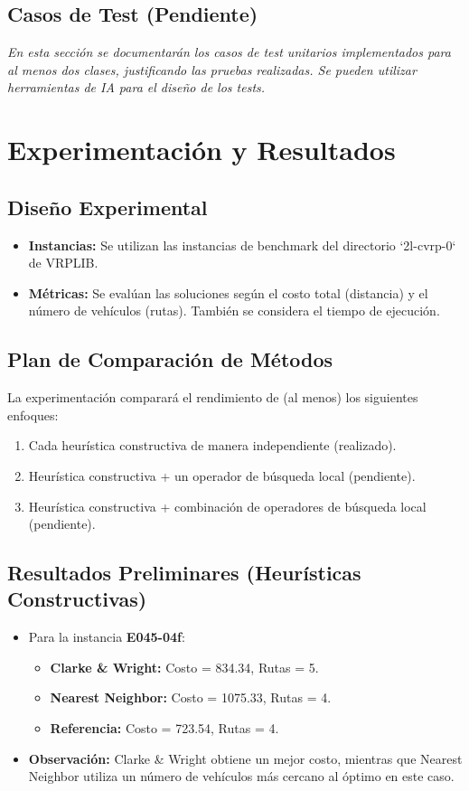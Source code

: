 \documentclass[a4paper,12pt]{article}
\begin{document}
\subsection{Casos de Test (Pendiente)}
\textit{En esta sección se documentarán los casos de test unitarios implementados para al menos dos clases, justificando las pruebas realizadas. Se pueden utilizar herramientas de IA para el diseño de los tests.}

\section{Experimentación y Resultados}

\subsection{Diseño Experimental}
\begin{itemize}
    \item \textbf{Instancias:} Se utilizan las instancias de benchmark del directorio `2l-cvrp-0` de VRPLIB.
    \item \textbf{Métricas:} Se evalúan las soluciones según el costo total (distancia) y el número de vehículos (rutas). También se considera el tiempo de ejecución.
\end{itemize}

\subsection{Plan de Comparación de Métodos}
La experimentación comparará el rendimiento de (al menos) los siguientes enfoques:
\begin{enumerate}
    \item Cada heurística constructiva de manera independiente (realizado).
    \item Heurística constructiva + un operador de búsqueda local (pendiente).
    \item Heurística constructiva + combinación de operadores de búsqueda local (pendiente).
\end{enumerate}

\subsection{Resultados Preliminares (Heurísticas Constructivas)}
\begin{itemize}
    \item Para la instancia \textbf{E045-04f}:
    \begin{itemize}
        \item \textbf{Clarke \& Wright:} Costo = 834.34, Rutas = 5.
        \item \textbf{Nearest Neighbor:} Costo = 1075.33, Rutas = 4.
        \item \textbf{Referencia:} Costo = 723.54, Rutas = 4.
    \end{itemize}
    \item \textbf{Observación:} Clarke \& Wright obtiene un mejor costo, mientras que Nearest Neighbor utiliza un número de vehículos más cercano al óptimo en este caso.
\end{itemize}
\end{document}
